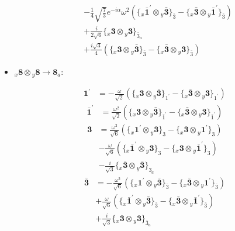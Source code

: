 \documentclass[english]{article}
\newcommand{\rep}[1]{\mathbf{#1}}
\newcommand{\repx}[2]{{}_{#2}\mathbf{#1}}
\newcommand{\tsprodx}[2]{\repx{#1}{x}\otimes\repx{#2}{y}}
\newcommand{\subcgt}[3]{\big\{ \tsprodx{#1}{#2}\big\}^{}_{#3}}
\begin{document}
\begin{itemize}
\begin{fleqn}
\begin{align*}
 & -\frac{1}{4} \sqrt{\frac{7}{3}} e^{-i \alpha } \omega ^2\left(\subcgt{\bar{1}^{\prime}}{\bar{3}}{\bar{3}}-\subcgt{\bar{3}}{\bar{1}^{\prime}}{\bar{3}}\right) \\ 
 & +\frac{i}{2 \sqrt{6}}\subcgt{3}{3}{\bar{3}_{a}} \\ 
 & +\frac{i \sqrt{3}}{4}\left(\subcgt{3}{\bar{3}}{\bar{3}}-\subcgt{\bar{3}}{3}{\bar{3}}\right)
\end{align*}
\end{fleqn}
\item $\tsprodx{8}{8}\to\rep{8}_{a}$:
\begin{fleqn}
\begin{align*}
\rep{1^{\prime}} & = -\frac{\omega }{\sqrt{2}}\left(\subcgt{3}{\bar{3}}{1^{\prime}}-\subcgt{\bar{3}}{3}{1^{\prime}}\right)
\end{align*}
\begin{align*}
\rep{\bar{1}^{\prime}} & = \frac{\omega ^2}{\sqrt{2}}\left(\subcgt{3}{\bar{3}}{\bar{1}^{\prime}}-\subcgt{\bar{3}}{3}{\bar{1}^{\prime}}\right)
\end{align*}
\begin{align*}
\rep{3} & = \frac{\omega ^2}{\sqrt{6}}\left(\subcgt{1^{\prime}}{3}{3}-\subcgt{3}{1^{\prime}}{3}\right) \\ 
 & -\frac{\omega }{\sqrt{6}}\left(\subcgt{\bar{1}^{\prime}}{3}{3}-\subcgt{3}{\bar{1}^{\prime}}{3}\right) \\ 
 & -\frac{i}{\sqrt{3}}\subcgt{\bar{3}}{\bar{3}}{3_{a}}
\end{align*}
\begin{align*}
\rep{\bar{3}} & = -\frac{\omega ^2}{\sqrt{6}}\left(\subcgt{1^{\prime}}{\bar{3}}{\bar{3}}-\subcgt{\bar{3}}{1^{\prime}}{\bar{3}}\right) \\ 
 & +\frac{\omega }{\sqrt{6}}\left(\subcgt{\bar{1}^{\prime}}{\bar{3}}{\bar{3}}-\subcgt{\bar{3}}{\bar{1}^{\prime}}{\bar{3}}\right) \\ 
 & +\frac{i}{\sqrt{3}}\subcgt{3}{3}{\bar{3}_{a}}
\end{align*}
\end{fleqn}
\end{itemize}
\end{document}
